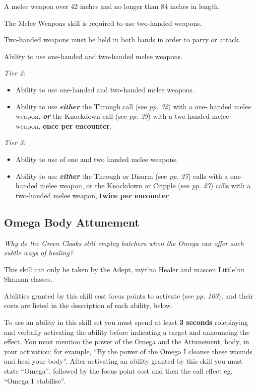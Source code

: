 A melee weapon over 42 inches and no longer than 84 inches in length.

The Melee Weapons skill is required to use two-handed weapons.

Two-handed weapons must be held in both hands in order to parry or attack.

Ability to use one-handed and two-handed melee weapons.

\textit{Tier 2:}

\begin{itemize}
\item Ability to use one-handed and two-handed melee weapons.

\item Ability to use \textbf{\textit{either}} the Through call (see \textit{pp. 32}) with a one- handed melee weapon, \textbf{\textit{or}} the Knockdown call (see \textit{pp. 29}) with a two-handed melee weapon, \textbf{once per encounter}.

\end{itemize}
\textit{Tier 3:}

\begin{itemize}
\item Ability to use of one and two handed melee weapons.

\item Ability to use \textbf{\textit{either}} the Through or Disarm (see \textit{pp. 27}) calls with a one-handed melee weapon, or the Knockdown or Cripple (see \textit{pp. 27}) calls with a two-handed melee weapon, \textbf{twice per encounter}.

\end{itemize}
\subsection{Omega Body Attunement}

\textit{Why do the Green Cloaks still employ butchers when the Omega can offer such subtle ways of healing?}

This skill can only be taken by the Adept, myr'na Healer and mascen Little'un Shaman classes.

Abilities granted by this skill cost focus points to activate (see \textit{pp. 103}), and their costs are listed in the description of each ability, below.

To use an ability in this skill set you must spend at least \textbf{3 seconds} roleplaying and verbally activating the ability before indicating a target and announcing the effect. You must mention the power of the Omega and the Attunement, body, in your activation; for example, ``By the power of the Omega I cleanse these wounds and heal your body''. After activating an ability granted by this skill you must state ``Omega'', followed by the focus point cost and then the call effect eg, ``Omega 1 stabilise''.

